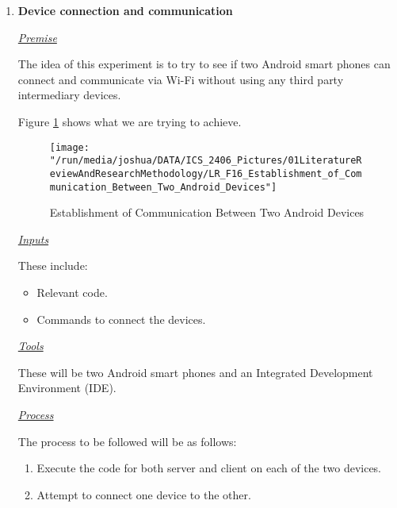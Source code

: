 \documentclass[12pt,svgnames,smaller]{article} %
\begin{document}
		\begin{enumerate}
			\item \textbf{Device connection and communication}
			
			\emph{\underline{\textsf{Premise}}}
			
			The idea of this experiment is to try to see if two Android smart phones can connect and communicate via Wi-Fi without using any third party intermediary devices.
			
			Figure \ref{fig:LiteratureReview-Figure16} shows what we are trying to achieve.
			
			\begin{figure}
				\centering
				\texttt{[image: "/run/media/joshua/DATA/ICS\_2406\_Pictures/01LiteratureReviewAndResearchMethodology/LR\_F16\_Establishment\_of\_Communication\_Between\_Two\_Android\_Devices"]}
				\caption{Establishment of Communication Between Two Android Devices}
				\label{fig:LiteratureReview-Figure16}
			\end{figure}
			
			\textsf{\underline{\emph{Inputs}}}
			
			These include:
			
			\begin{itemize}
				\item Relevant code.
				\item Commands to connect the devices.
			\end{itemize}
			
			\emph{\underline{\textsf{Tools}}}
			
			These will be two Android smart phones and an Integrated Development Environment (IDE).
			
			\emph{\underline{\textsf{Process}}}
			
			The process to be followed will be as follows:
			
			\begin{enumerate}
				\item Execute the code for both server and client on each of the two devices.
				\item Attempt to connect one device to the other.
			\end{enumerate}
			

\end{enumerate}
\end{document}
